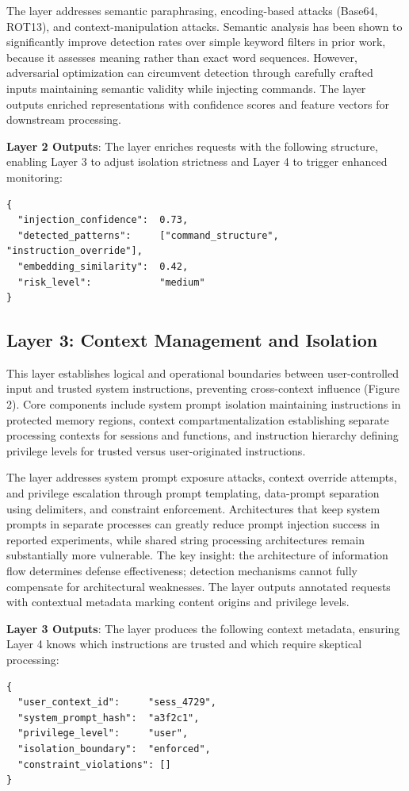 \documentclass[conference]{IEEEtran}
\begin{document}
The layer addresses semantic paraphrasing, encoding-based attacks (Base64, ROT13), and context-manipulation attacks. Semantic analysis has been shown to significantly improve detection rates over simple keyword filters in prior work, because it assesses meaning rather than exact word sequences. However, adversarial optimization can circumvent detection through carefully crafted inputs maintaining semantic validity while injecting commands. The layer outputs enriched representations with confidence scores and feature vectors for downstream processing.

\textbf{Layer 2 Outputs}: The layer enriches requests with the following structure, enabling Layer 3 to adjust isolation strictness and Layer 4 to trigger enhanced monitoring:
\begin{lstlisting}[style=jsonoutput]
{
  "injection_confidence":  0.73,
  "detected_patterns":     ["command_structure", "instruction_override"],
  "embedding_similarity":  0.42,
  "risk_level":            "medium"
}
\end{lstlisting}

\subsection{Layer 3: Context Management and Isolation}
This layer establishes logical and operational boundaries between user-controlled input and trusted system instructions, preventing cross-context influence (Figure 2). Core components include system prompt isolation maintaining instructions in protected memory regions, context compartmentalization establishing separate processing contexts for sessions and functions, and instruction hierarchy defining privilege levels for trusted versus user-originated instructions.

The layer addresses system prompt exposure attacks, context override attempts, and privilege escalation through prompt templating, data-prompt separation using delimiters, and constraint enforcement. Architectures that keep system prompts in separate processes can greatly reduce prompt injection success in reported experiments, while shared string processing architectures remain substantially more vulnerable. The key insight: the architecture of information flow determines defense effectiveness; detection mechanisms cannot fully compensate for architectural weaknesses. The layer outputs annotated requests with contextual metadata marking content origins and privilege levels.

\textbf{Layer 3 Outputs}: The layer produces the following context metadata, ensuring Layer 4 knows which instructions are trusted and which require skeptical processing:
\begin{lstlisting}[style=jsonoutput]
{
  "user_context_id":     "sess_4729",
  "system_prompt_hash":  "a3f2c1",
  "privilege_level":     "user",
  "isolation_boundary":  "enforced",
  "constraint_violations": []
}
\end{lstlisting}
\end{document}
